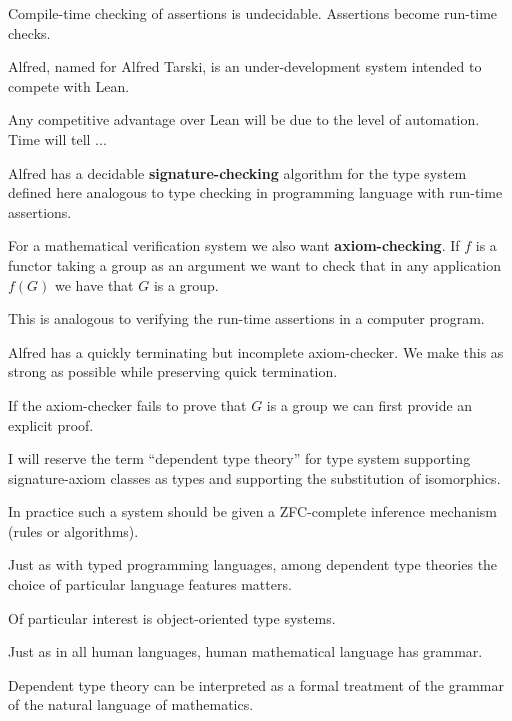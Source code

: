 {\vfill
Compile-time checking of assertions is undecidable. Assertions become run-time checks.



Alfred, named for Alfred Tarski, is an under-development system intended to compete with Lean.

\vfill
Any competitive advantage over Lean will be due to the level of automation.  Time will tell ...



Alfred has a decidable {\bf signature-checking} algorithm for the type system defined here analogous
to type checking in programming language with run-time assertions.

\vfill
For a mathematical verification system we also want {\bf axiom-checking}. If $f$ is a functor taking a group as an argument
we want to check that in any application $f(G)$ we have that $G$ is a group.

\vfill
This is analogous to verifying the run-time assertions in a computer program.


Alfred has a quickly terminating but incomplete axiom-checker.  We make this as strong as possible while preserving quick termination.

\vfill
If the axiom-checker fails to prove that $G$ is a group we can first provide an explicit proof.


\vfill
I will reserve the term ``dependent type theory'' for type system supporting signature-axiom classes as types and
supporting the substitution of isomorphics.

\vfill
In practice such a system should be given a ZFC-complete inference mechanism (rules or algorithms).

\vfill
Just as with typed programming languages, among dependent type theories the choice of particular language features matters.

\vfill
Of particular interest is object-oriented type systems.



Just as in all human languages, human mathematical language has grammar.

\vfill
Dependent type theory can be interpreted as a formal treatment of the grammar of the natural language of mathematics.

}
